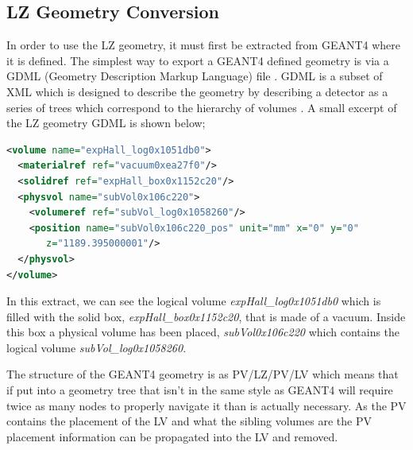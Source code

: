 \subsection{LZ Geometry Conversion}
\par
In order to use the LZ geometry, it must first be extracted from GEANT4 where it is defined.
The simplest way to export a GEANT4 defined geometry is via a GDML (Geometry Description Markup Language) file \cite{GDML_USER_GUIDE_ref}.
GDML is a subset of XML which is designed to describe the geometry by describing a detector as a series of trees which correspond to the hierarchy of volumes \cite{GDML_USER_GUIDE_ref}.
A small excerpt of the LZ geometry GDML is shown below;
\begin{lstlisting}[backgroundcolor=\color{lightgrey},
                   language=XML, xleftmargin = 0.5cm]
<volume name="expHall_log0x1051db0">
  <materialref ref="vacuum0xea27f0"/>
  <solidref ref="expHall_box0x1152c20"/>
  <physvol name="subVol0x106c220">
    <volumeref ref="subVol_log0x1058260"/>
    <position name="subVol0x106c220_pos" unit="mm" x="0" y="0"
       z="1189.395000001"/>
  </physvol>
</volume>
\end{lstlisting}
In this extract, we can see the logical volume \textit{expHall\_log0x1051db0} which is filled with the solid box, \textit{expHall\_box0x1152c20}, that is made of a vacuum.
Inside this box a physical volume has been placed, \textit{subVol0x106c220} which contains the logical volume \textit{subVol\_log0x1058260}.
\par
The structure of the GEANT4 geometry is as PV/LZ/PV/LV which means that if put into a geometry tree that isn't in the same style as GEANT4 will require twice as many nodes to properly navigate it than is actually necessary.
As the PV contains the placement of the LV and what the sibling volumes are the PV placement information can be propagated into the LV and removed.

